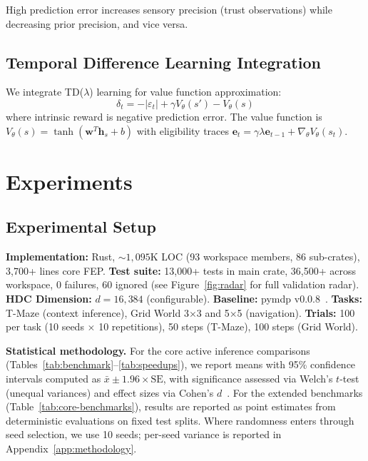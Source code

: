 \documentclass[10pt,letterpaper]{article}
\newcommand{\hvec}[1]{\mathbf{h}_{#1}}
\begin{document}
High prediction error increases sensory precision (trust observations) while decreasing prior precision, and vice versa.

\subsection{Temporal Difference Learning Integration}

We integrate TD($\lambda$) learning for value function approximation:
\begin{equation}
\delta_t = -|\varepsilon_t| + \gamma V_\theta(s') - V_\theta(s)
\end{equation}
where intrinsic reward is negative prediction error. The value function is $V_\theta(s) = \tanh(\mathbf{w}^T \hvec{s} + b)$ with eligibility traces $\mathbf{e}_t = \gamma\lambda\mathbf{e}_{t-1} + \nabla_\theta V_\theta(s_t)$.

\section{Experiments}

\subsection{Experimental Setup}

\textbf{Implementation:} Rust, ${\sim}1{,}095$K LOC (93 workspace members, 86 sub-crates), 3,700+ lines core FEP.
\textbf{Test suite:} 13,000+ tests in main crate, 36,500+ across workspace, 0 failures, 60 ignored (see Figure~\ref{fig:radar} for full validation radar).
\textbf{HDC Dimension:} $d = 16{,}384$ (configurable).
\textbf{Baseline:} pymdp v0.0.8~\cite{heins2022pymdp}.
\textbf{Tasks:} T-Maze (context inference), Grid World 3$\times$3 and 5$\times$5 (navigation).
\textbf{Trials:} 100 per task (10 seeds $\times$ 10 repetitions), 50 steps (T-Maze), 100 steps (Grid World).

\textbf{Statistical methodology.}
For the core active inference comparisons (Tables~\ref{tab:benchmark}--\ref{tab:speedups}), we report means with 95\% confidence intervals computed as $\bar{x} \pm 1.96 \times \mathrm{SE}$, with significance assessed via Welch's $t$-test (unequal variances) and effect sizes via Cohen's $d$~\cite{cohen1988statistical}.
For the extended benchmarks (Table~\ref{tab:core-benchmarks}), results are reported as point estimates from deterministic evaluations on fixed test splits.
Where randomness enters through seed selection, we use 10 seeds; per-seed variance is reported in Appendix~\ref{app:methodology}.
\end{document}
